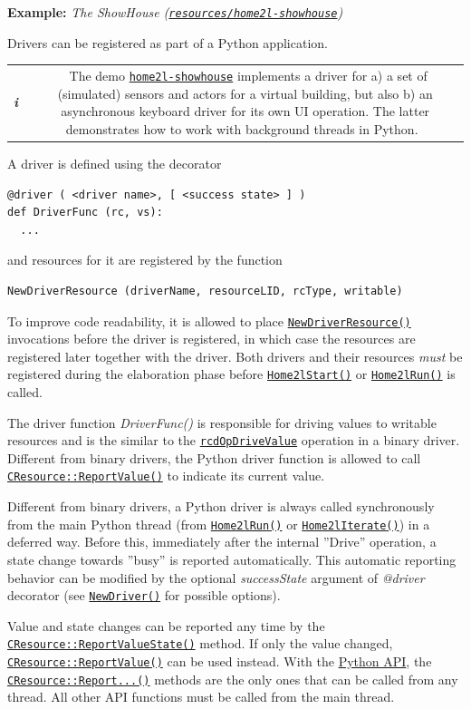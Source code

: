 \documentclass[12pt,english,parskip=half,headheight=19pt]{scrreprt}
\newcommand{\infobox}[1]{
  \par
  \medskip
  \hfill
  \setlength\arrayrulewidth{1pt}
  \begin{tabular}[t]{c|c|}
    \parbox{1.8em}{\hfill\textit{\Huge\textbf{i}\,}}
    &
    \,\parbox{0.89\linewidth}{\setlength{\parskip}{0.5em} \small #1}\,
  \end{tabular}
  \medskip
  \par
}
\newcommand{\idx}[1]{#1\index{#1}}
\newcommand{\reftool}[1]{\hyperref[tool:#1]{\texttt{\idx{#1}}}}
\newcommand{\refdoc}[2]{\href{#1}{#2}}              %
\newcommand{\refsrc}[1]{\href{#1}{\texttt{#1}}}     %
\newcommand{\refapic}[1]{\href{home2l-api_c/index.html}{\mbox{\texttt{#1}}}}            %
\newcommand{\refapipython}[1]{\href{home2l-api_python/index.html}{\mbox{\texttt{#1}}}}  %
\newcommand{\theapipython}{\refdoc{home2l-api_python/index.html}{Python API}}
\begin{document}
\textbf{Example:} \textit{The ShowHouse (\refsrc{resources/home2l-showhouse})}

Drivers can be registered as part of a Python application.

\infobox{
  The demo \reftool{home2l-showhouse} implements a driver for a) a set of (simulated)
  sensors and actors for a virtual building, but also
  b) an asynchronous keyboard driver for its own UI operation.
  The latter demonstrates how to work with background threads in Python.
}

A driver is defined using the decorator
\begin{lstlisting}
@driver ( <driver name>, [ <success state> ] )
def DriverFunc (rc, vs):
  ...
\end{lstlisting}

and resources for it are registered by the function
\begin{lstlisting}
NewDriverResource (driverName, resourceLID, rcType, writable)
\end{lstlisting}

To improve code readability, it is allowed to place \refapipython{NewDriverResource()} invocations before the driver is registered, in which case the resources are registered later together with the driver. Both drivers and their resources \textit{must} be registered during the elaboration phase before \refapipython{Home2lStart()} or \refapipython{Home2lRun()} is called.

The driver function \textit{DriverFunc()} is responsible for driving values to writable resources and is the similar to the
\refapic{rcdOpDriveValue} operation in a binary driver. Different from binary drivers, the Python driver function is allowed to call \refapic{CResource::ReportValue()} to indicate its current value.

Different from binary drivers, a Python driver is always called synchronously from the main Python thread (from \refapipython{Home2lRun()} or \refapipython{Home2lIterate()}) in a deferred way. Before this, immediately after the internal ''Drive'' operation, a state change towards ''busy'' is reported automatically. This automatic reporting behavior can be modified by the optional \textit{successState} argument of \textit{@driver} decorator (see \refapipython{NewDriver()} for possible options).

Value and state changes can be reported any time by the \refapic{CResource::ReportValueState()} method.
If only the value changed, \refapic{CResource::ReportValue()} can be used instead. With the \theapipython{}, the \refapic{CResource::Report...()} methods are the only ones that can be called from any thread. All other API functions must be called from the main thread.
\end{document}
